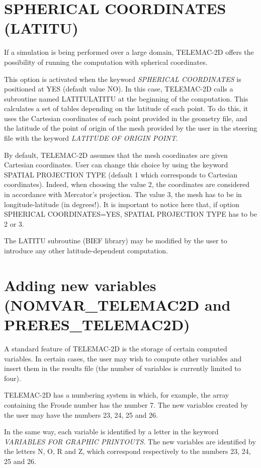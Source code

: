 \section{ SPHERICAL COORDINATES (LATITU) }

 If a simulation is being performed over a large domain, TELEMAC-2D offers the possibility of running the computation with spherical coordinates.

 This option is activated when the keyword \textit{SPHERICAL COORDINATES} is positioned at YES (default value NO). In this case, TELEMAC-2D calls a subroutine named LATITULATITU at the beginning of the computation. This calculates a set of tables depending on the latitude of each point. To do this, it uses the Cartesian coordinates of each point provided in the geometry file, and the latitude of the point of origin of the mesh provided by the user in the steering file with the keyword \textit{LATITUDE OF ORIGIN POINT}.

 By default, TELEMAC-2D assumes that the mesh coordinates are given Cartesian coordinates. User can change this choice by using the keyword SPATIAL PROJECTION TYPE (default 1 which corresponds to Cartesian coordinates). Indeed, when choosing the value 2, the coordinates are considered in accordance with Mercator's projection. The value 3, the mesh has to be in longitude-latitude (in degrees!). It is important to notice here that, if option SPHERICAL COORDINATES=YES, SPATIAL PROJECTION TYPE has to be 2 or 3.

 The LATITU subroutine (BIEF library) may be modified by the user to introduce any other latitude-dependent computation.


\section{ Adding new variables (NOMVAR\_TELEMAC2D and PRERES\_TELEMAC2D)}

 A standard feature of TELEMAC-2D is the storage of certain computed variables. In certain cases, the user may wish to compute other variables and insert them in the results file (the number of variables is currently limited to four).

 TELEMAC-2D has a numbering system in which, for example, the array containing the Froude number has the number 7. The new variables created by the user may have the numbers 23, 24, 25 and 26.

 In the same way, each variable is identified by a letter in the keyword \textit{VARIABLES FOR GRAPHIC PRINTOUTS}. The new variables are identified by the letters N, O, R and Z, which correspond respectively to the numbers 23, 24, 25 and 26.

